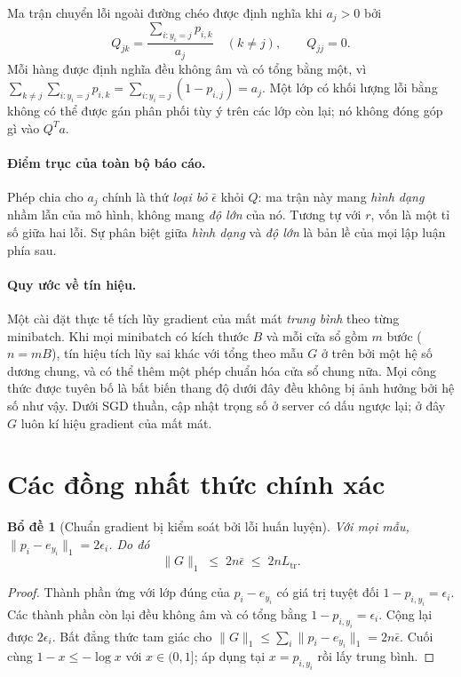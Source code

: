 \documentclass[11pt]{article}
\newtheorem{bode}[dinhly]{Bổ đề}
\theoremstyle{remark}
\begin{document}
Ma trận chuyển lỗi ngoài đường chéo được định nghĩa khi $a_j > 0$ bởi
\[
 Q_{jk} = \frac{\sum_{i : y_i = j} p_{i,k}}{a_j} \quad (k \ne j),
 \qquad Q_{jj} = 0 .
\]
Mỗi hàng được định nghĩa đều không âm và có tổng bằng một, vì
$\sum_{k\ne j}\sum_{i:y_i=j} p_{i,k} = \sum_{i:y_i=j}(1-p_{i,j}) = a_j$. Một
lớp có khối lượng lỗi bằng không có thể được gán phân phối tùy ý trên các lớp
còn lại; nó không đóng góp gì vào $Q^Ta$.

\paragraph{Điểm trục của toàn bộ báo cáo.}
Phép chia cho $a_j$ chính là thứ \emph{loại bỏ} $\bar\epsilon$ khỏi $Q$: ma
trận này mang \emph{hình dạng} nhầm lẫn của mô hình, không mang \emph{độ lớn}
của nó. Tương tự với $r$, vốn là một tỉ số giữa hai lỗi. Sự phân biệt giữa
\emph{hình dạng} và \emph{độ lớn} là bản lề của mọi lập luận phía sau.

\paragraph{Quy ước về tín hiệu.}
Một cài đặt thực tế tích lũy gradient của mất mát \emph{trung bình} theo từng
minibatch. Khi mọi minibatch có kích thước $B$ và mỗi cửa sổ gồm $m$ bước
($n = mB$), tín hiệu tích lũy sai khác với tổng theo mẫu $G$ ở trên bởi một
hệ số dương chung, và có thể thêm một phép chuẩn hóa cửa sổ chung nữa. Mọi
công thức được tuyên bố là bất biến thang độ dưới đây đều không bị ảnh hưởng
bởi hệ số như vậy. Dưới SGD thuần, cập nhật trọng số ở server có dấu ngược
lại; ở đây $G$ luôn kí hiệu gradient của mất mát.

\section{Các đồng nhất thức chính xác}

\begin{bode}[Chuẩn gradient bị kiểm soát bởi lỗi huấn luyện]
\label{bd:chuan}
Với mọi mẫu, $\|p_i - e_{y_i}\|_1 = 2\epsilon_i$. Do đó
\[
 \|G\|_1 \;\le\; 2n\bar\epsilon \;\le\; 2n L_{\mathrm{tr}} .
\]
\end{bode}

\begin{proof}
Thành phần ứng với lớp đúng của $p_i - e_{y_i}$ có giá trị tuyệt đối
$1 - p_{i,y_i} = \epsilon_i$. Các thành phần còn lại đều không âm và có tổng
bằng $1 - p_{i,y_i} = \epsilon_i$. Cộng lại được $2\epsilon_i$. Bất đẳng thức
tam giác cho $\|G\|_1 \le \sum_i \|p_i - e_{y_i}\|_1 = 2n\bar\epsilon$. Cuối
cùng $1 - x \le -\log x$ với $x \in (0,1]$; áp dụng tại $x = p_{i,y_i}$ rồi
lấy trung bình.
\end{proof}
\end{document}
